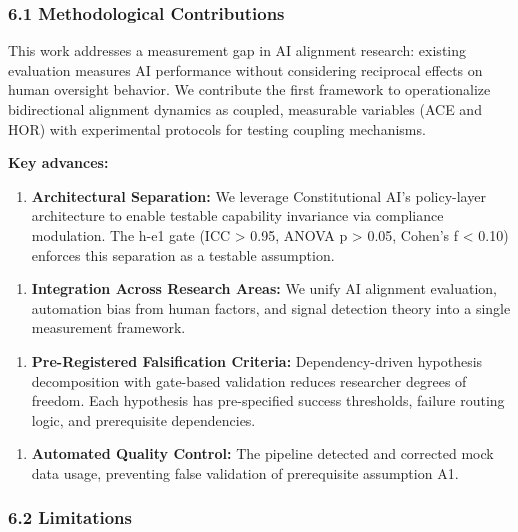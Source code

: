 
\subsubsection{6.1 Methodological Contributions}

This work addresses a measurement gap in AI alignment research: existing evaluation measures AI performance without considering reciprocal effects on human oversight behavior. We contribute the first framework to operationalize bidirectional alignment dynamics as coupled, measurable variables (ACE and HOR) with experimental protocols for testing coupling mechanisms.

\textbf{Key advances:}

\begin{enumerate}
\item \textbf{Architectural Separation:} We leverage Constitutional AI's policy-layer architecture to enable testable capability invariance via compliance modulation. The h-e1 gate (ICC > 0.95, ANOVA p > 0.05, Cohen's f < 0.10) enforces this separation as a testable assumption.
\end{enumerate}

\begin{enumerate}
\item \textbf{Integration Across Research Areas:} We unify AI alignment evaluation, automation bias from human factors, and signal detection theory into a single measurement framework.
\end{enumerate}

\begin{enumerate}
\item \textbf{Pre-Registered Falsification Criteria:} Dependency-driven hypothesis decomposition with gate-based validation reduces researcher degrees of freedom. Each hypothesis has pre-specified success thresholds, failure routing logic, and prerequisite dependencies.
\end{enumerate}

\begin{enumerate}
\item \textbf{Automated Quality Control:} The pipeline detected and corrected mock data usage, preventing false validation of prerequisite assumption A1.
\end{enumerate}

\subsubsection{6.2 Limitations}

